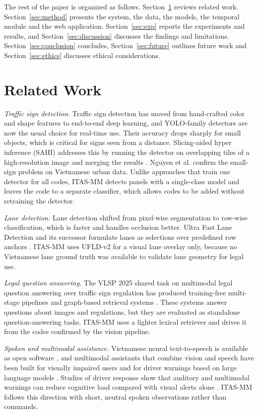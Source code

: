 \documentclass[conference,a4paper]{IEEEtran}
\begin{document}
The rest of the paper is organized as follows. Section~\ref{sec:related} reviews related work. Section~\ref{sec:method} presents the system, the data, the models, the temporal module and the web application. Section~\ref{sec:exp} reports the experiments and results, and Section~\ref{sec:discussion} discusses the findings and limitations. Section~\ref{sec:conclusion} concludes, Section~\ref{sec:future} outlines future work and Section~\ref{sec:ethics} discusses ethical considerations.

\section{Related Work}\label{sec:related}

\textit{Traffic sign detection.} Traffic sign detection has moved from hand-crafted color and shape features to end-to-end deep learning, and YOLO-family detectors are now the usual choice for real-time use. Their accuracy drops sharply for small objects, which is critical for signs seen from a distance. Slicing-aided hyper inference (SAHI) addresses this by running the detector on overlapping tiles of a high-resolution image and merging the results \cite{sahi}. Nguyen et al. \cite{nguyen2025} confirm the small-sign problem on Vietnamese urban data. Unlike approaches that train one detector for all codes, ITAS-MM detects panels with a single-class model and leaves the code to a separate classifier, which allows codes to be added without retraining the detector.

\textit{Lane detection.} Lane detection shifted from pixel-wise segmentation to row-wise classification, which is faster and handles occlusion better. Ultra Fast Lane Detection and its successor formulate lanes as selections over predefined row anchors \cite{ufld,ufldv2}. ITAS-MM uses UFLD-v2 for a visual lane overlay only, because no Vietnamese lane ground truth was available to validate lane geometry for legal use.

\textit{Legal question answering.} The VLSP 2025 shared task on multimodal legal question answering over traffic sign regulation \cite{vlsp2025} has produced training-free multi-stage pipelines \cite{lexisign} and graph-based retrieval systems \cite{graphsign}. These systems answer questions about images and regulations, but they are evaluated as standalone question-answering tasks. ITAS-MM uses a lighter lexical retriever and drives it from the codes confirmed by the vision pipeline.

\textit{Spoken and multimodal assistance.} Vietnamese neural text-to-speech is available as open software \cite{vieneu}, and multimodal assistants that combine vision and speech have been built for visually impaired users \cite{naviblind} and for driver warnings based on large language models \cite{xu2024}. Studies of driver response show that auditory and multimodal warnings can reduce cognitive load compared with visual alerts alone \cite{politis}. ITAS-MM follows this direction with short, neutral spoken observations rather than commands.
\end{document}
